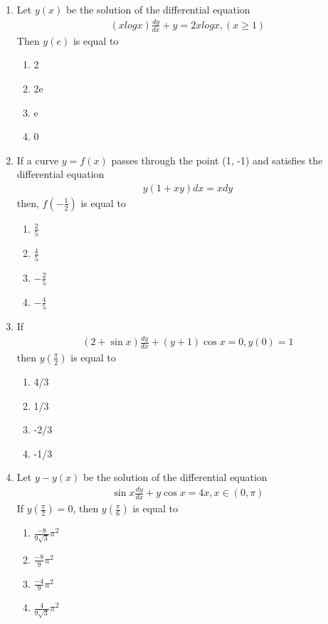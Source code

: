 \begin{enumerate}[label=\arabic*.,ref=\thesubsection.\theenumi]
\item Let $y(x)$ be the solution of the differential equation
\begin{align*}
(xlogx)\frac{dy}{dx} + y = 2x logx, (x \geq 1)
\end{align*}
Then $y(e)$ is equal to
\begin{enumerate}
\item 2
\item 2e
\item e
\item 0
\end{enumerate}

\item If a curve $y = f(x)$ passes through the point (1, -1) and satisfies the differential equation 
\begin{align*}
y(1 + xy)dx = xdy
\end{align*}
then, $f\left(-\frac{1}{2}\right)$ is equal to
\begin{enumerate}
\item $\frac{2}{5}$
\item $\frac{4}{5}$
\item $-\frac{2}{5}$
\item $-\frac{4}{5}$
\end{enumerate}

\item If
\begin{align*}
(2 + \sin x)\frac{dy}{dx} + (y + 1)\cos x = 0, y(0) = 1
\end{align*}
then $y\left(\frac{\pi}{2}\right)$ is equal to
\begin{enumerate}
\item 4/3
\item 1/3
\item -2/3
\item -1/3
\end{enumerate}

\item Let $y - y(x)$ be the solution of the differential equation
\begin{align*}
\sin x\frac{dy}{dx} + y\cos x = 4x, x \in (0, \pi)
\end{align*}
If $y\left(\frac{\pi}{2}\right) = 0$, then $y\left(\frac{\pi}{6}\right)$ is equal to
\begin{enumerate}
\item $\frac{-8}{9\sqrt{3}}\pi^{2}$
\item $\frac{-8}{9}\pi^{2}$
\item $\frac{-4}{9}\pi^{2}$
\item $\frac{4}{9\sqrt{3}}\pi^{2}$
\end{enumerate}


\end{enumerate}

